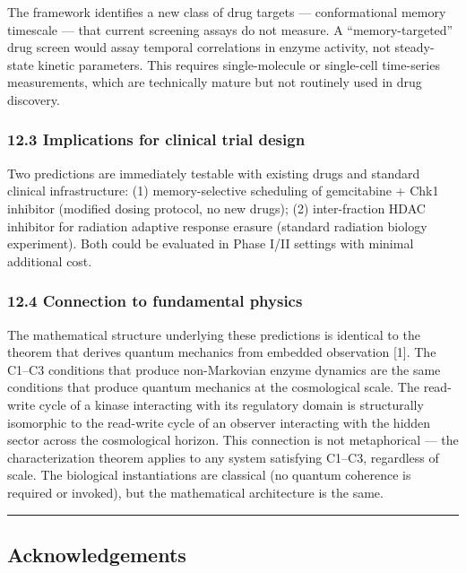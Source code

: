 \documentclass[
  11pt,
]{article}
\begin{document}
The framework identifies a new class of drug targets --- conformational
memory timescale --- that current screening assays do not measure. A
``memory-targeted'' drug screen would assay temporal correlations in
enzyme activity, not steady-state kinetic parameters. This requires
single-molecule or single-cell time-series measurements, which are
technically mature but not routinely used in drug discovery.

\hypertarget{implications-for-clinical-trial-design}{%
\subsubsection{12.3 Implications for clinical trial
design}\label{implications-for-clinical-trial-design}}

Two predictions are immediately testable with existing drugs and
standard clinical infrastructure: (1) memory-selective scheduling of
gemcitabine + Chk1 inhibitor (modified dosing protocol, no new drugs);
(2) inter-fraction HDAC inhibitor for radiation adaptive response
erasure (standard radiation biology experiment). Both could be evaluated
in Phase I/II settings with minimal additional cost.

\hypertarget{connection-to-fundamental-physics}{%
\subsubsection{12.4 Connection to fundamental
physics}\label{connection-to-fundamental-physics}}

The mathematical structure underlying these predictions is identical to
the theorem that derives quantum mechanics from embedded observation
{[}1{]}. The C1--C3 conditions that produce non-Markovian enzyme
dynamics are the same conditions that produce quantum mechanics at the
cosmological scale. The read-write cycle of a kinase interacting with
its regulatory domain is structurally isomorphic to the read-write cycle
of an observer interacting with the hidden sector across the
cosmological horizon. This connection is not metaphorical --- the
characterization theorem applies to any system satisfying C1--C3,
regardless of scale. The biological instantiations are classical (no
quantum coherence is required or invoked), but the mathematical
architecture is the same.

\begin{center}\rule{0.5\linewidth}{0.5pt}\end{center}

\hypertarget{acknowledgements}{%
\subsection{Acknowledgements}\label{acknowledgements}}
\end{document}
